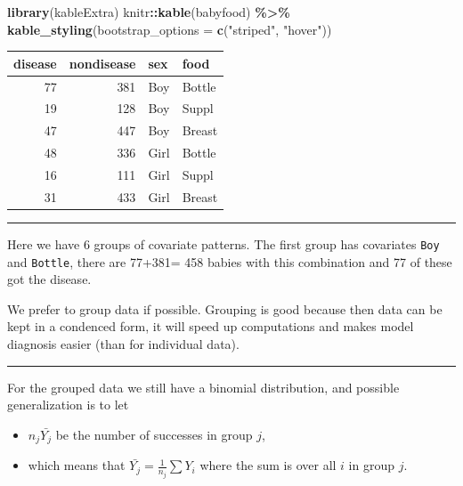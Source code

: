 \documentclass[
]{article}
\newenvironment{Shaded}{\begin{snugshade}}{\end{snugshade}}
\newcommand{\AttributeTok}[1]{\textcolor[rgb]{0.13,0.29,0.53}{#1}}
\newcommand{\FunctionTok}[1]{\textcolor[rgb]{0.13,0.29,0.53}{\textbf{#1}}}
\newcommand{\NormalTok}[1]{#1}
\newcommand{\SpecialCharTok}[1]{\textcolor[rgb]{0.81,0.36,0.00}{\textbf{#1}}}
\newcommand{\StringTok}[1]{\textcolor[rgb]{0.31,0.60,0.02}{#1}}
\providecommand{\tightlist}{%
  \setlength{\itemsep}{0pt}\setlength{\parskip}{0pt}}
\begin{document}
\begin{Shaded}
\begin{Highlighting}[]
\FunctionTok{library}\NormalTok{(kableExtra)}
\NormalTok{knitr}\SpecialCharTok{::}\FunctionTok{kable}\NormalTok{(babyfood) }\SpecialCharTok{\%\textgreater{}\%}
  \FunctionTok{kable\_styling}\NormalTok{(}\AttributeTok{bootstrap\_options =} \FunctionTok{c}\NormalTok{(}\StringTok{"striped"}\NormalTok{, }\StringTok{"hover"}\NormalTok{))}
\end{Highlighting}
\end{Shaded}

\begin{table}
\centering
\begin{tabular}{r|r|l|l}
\hline
disease & nondisease & sex & food\\
\hline
77 & 381 & Boy & Bottle\\
\hline
19 & 128 & Boy & Suppl\\
\hline
47 & 447 & Boy & Breast\\
\hline
48 & 336 & Girl & Bottle\\
\hline
16 & 111 & Girl & Suppl\\
\hline
31 & 433 & Girl & Breast\\
\hline
\end{tabular}
\end{table}

\begin{center}\rule{0.5\linewidth}{0.5pt}\end{center}

Here we have 6 groups of covariate patterns. The first group has
covariates \texttt{Boy} and \texttt{Bottle}, there are 77+381= 458
babies with this combination and 77 of these got the disease.

We prefer to group data if possible. Grouping is good because then data
can be kept in a condenced form, it will speed up computations and makes
model diagnosis easier (than for individual data).

\begin{center}\rule{0.5\linewidth}{0.5pt}\end{center}

For the grouped data we still have a binomial distribution, and possible
generalization is to let

\begin{itemize}
\tightlist
\item
  \(n_j\bar{Y_j}\) be the number of successes in group \(j\),
\item
  which means that \(\bar{Y_j}=\frac{1}{n_j}\sum Y_i\) where the sum is
  over all \(i\) in group \(j\).
\end{itemize}
\end{document}
